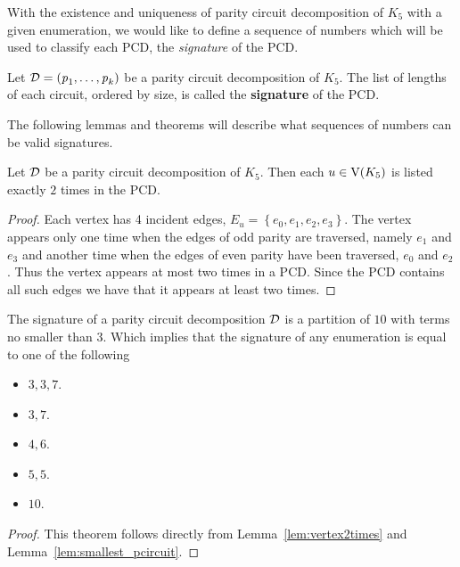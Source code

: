 \noindent
With the existence and uniqueness of parity circuit decomposition of $K_5$ with a given enumeration, we would like to define a sequence of numbers which will be used to classify each PCD, the {\em signature} of the PCD. 

\begin{definition}
  \label{def:signature}
Let $\operatorname{\mathcal{D}} = \left( \operatorname{\mathit{p}}_1 , \ldots, \operatorname{\mathit{p}}_k \right)$ be a parity circuit decomposition of $K_5$. The list of lengths of each circuit, ordered by size, is called the {\bf signature} of the PCD. 
\end{definition}

\noindent
The following lemmas and theorems will describe what sequences of numbers can be valid signatures.

\begin{lemma}
\label{lem:vertex2times}
Let $\operatorname{\mathcal{D}}$ be a parity circuit decomposition of $K_5$. Then each $u \in \mathrm{V}(K_5)$ is listed exactly $2$ times in the PCD. 
\end{lemma}

\begin{proof}

Each vertex has 4 incident edges, $E_u = \left\{e_0, e_1, e_2, e_3 \right\}$. The vertex appears only one time when the edges of odd parity are traversed, namely $e_1$ and $e_3$ and another time when the edges of even parity have been traversed, $e_0$ and $e_2$. Thus the vertex appears at most two times in a PCD. Since the PCD contains all such edges we have that it appears at least two times.
\end{proof}

\begin{theorem}
  \label{thm:K_5partition10}
The signature of a parity circuit decomposition $\operatorname{\mathcal{D}}$ is a partition of $10$ with terms no smaller than $3$. Which implies that the signature of any enumeration is equal to one of the following
\begin{itemize}
 \item $3,3,7$.
 \item $3,7$.
 \item $4,6$.
 \item $5,5$.
 \item $10$.
\end{itemize}
\end{theorem}
\begin{proof}
This theorem follows directly from Lemma~\ref{lem:vertex2times} and Lemma~\ref{lem:smallest_pcircuit}.
\end{proof}

